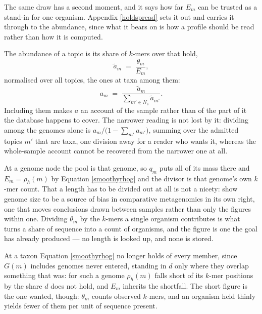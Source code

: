 \documentclass[pdflatex,sn-vancouver-num]{sn-jnl}
\begin{document}
    The same draw has a second moment, and it says how far $E_m$ can be trusted as a stand-in for
    one organism. Appendix \ref{holdspread} sets it out and carries it through to the abundance,
    since what it bears on is how a profile should be read rather than how it is computed.

    The abundance of a topic is its share of $k$-mers over that hold,
    \begin{equation}\label{smoothyabundance}
        \tilde{a}_m \;=\; \frac{\theta_m}{E_m} ,
    \end{equation}
    normalised over all topics, the ones at taxa among them:
    \begin{equation}\label{smoothynorm}
        a_m \;=\; \frac{\tilde{a}_m}{\sum_{m' \in N_s} \tilde{a}_{m'}} .
    \end{equation}
    Including them makes $a$ an account of the sample rather than of the part of it the database
    happens to cover. The narrower reading is not lost by it: dividing among the genomes alone is
    $a_m / \bigl( 1 - \sum_{m'} a_{m'} \bigr)$, summing over the admitted topics $m'$ that are taxa, one division
    away for a reader who wants it, whereas the whole-sample account cannot be recovered from the
    narrower one at all.

    At a genome node the pool is that genome, so $q_m$ puts all of its mass there and $E_m = \rho_h(m)$ by Equation \eqref{smoothyrhog} and the
    divisor is that genome's own $k$-mer count. That a length
    has to be divided out at all is not a nicety: \citet{beszteri2010} show genome size to be a
    source of bias in comparative metagenomics in its own right, one that moves conclusions drawn
    between samples rather than only the figures within one. Dividing $\theta_m$ by the $k$-mers a
    single organism contributes is what turns a share of sequence into a count of organisms, and the
    figure is one the goal has already produced --- no length is looked up, and none is stored.

    At a taxon Equation \eqref{smoothyrhog} no longer holds of every member, since $G(m)$
    includes genomes never entered, standing in $d$ only where they overlap something that was: for
    such a genome $\rho_h(m)$ falls short of its $k$-mer positions by the share $d$ does not hold, and
    $E_m$ inherits the shortfall. The short figure is the one wanted, though: $\theta_m$ counts
    observed $k$-mers, and an organism held thinly yields fewer of them per unit of sequence
    present.
\end{document}

